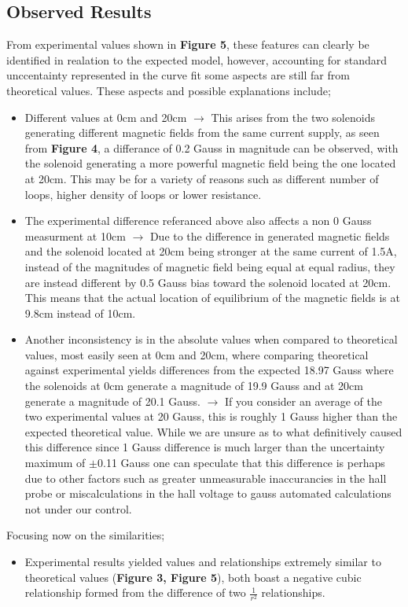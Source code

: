 \documentclass{article}
\begin{document}
   \subsection{Observed Results}
   From experimental values shown in \textbf{Figure 5}, these features can clearly be identified in realation to the expected model, however, accounting
   for standard unccentainty represented in the curve fit some aspects are still far from theoretical values. These aspects and possible explanations include;
   \begin{itemize}
       \item Different values at 0cm and 20cm \(\rightarrow\) This arises from the two solenoids generating different magnetic fields from the same current supply,
       as seen from \textbf{Figure 4}, a differance of 0.2 Gauss in magnitude can be observed, with the solenoid generating a more powerful magnetic field
       being the one located at 20cm. This may be for a variety of reasons such as different number of loops, higher density of loops or lower resistance.
       \item The experimental difference referanced above also affects a non 0 Gauss measurment at 10cm \(\rightarrow\) Due to the difference in generated magnetic fields
       and the solenoid located at 20cm being stronger at the same current of 1.5A, instead of the magnitudes of magnetic field being equal at equal radius, they are instead 
       different by 0.5 Gauss bias toward the solenoid located at 20cm. This means that the actual location of equilibrium of the magnetic fields is at 9.8cm instead of 10cm.
       \item Another inconsistency is in the absolute values when compared to theoretical values, most easily seen at 0cm and 20cm, where comparing theoretical against experimental yields 
       differences from the expected 18.97 Gauss where the solenoids at 0cm generate a magnitude of 19.9 Gauss and at 20cm generate a magnitude of 20.1 Gauss. \(\rightarrow\) If you consider 
       an average of the two experimental values at 20 Gauss, this is roughly 1 Gauss higher than the expected theoretical value. While we are unsure as to what definitively caused this difference 
       since 1 Gauss difference is much larger than the uncertainty maximum of \(\pm\)0.11 Gauss one can speculate that this difference is perhaps due to other factors such as greater unmeasurable inaccurancies
       in the hall probe or miscalculations in the hall voltage to gauss automated calculations not under our control.
   \end{itemize}
   Focusing now on the similarities;
   \begin{itemize}
       \item Experimental results yielded values and relationships extremely similar to theoretical values (\textbf{Figure 3, Figure 5}), both boast a negative cubic relationship 
       formed from the difference of two \(\frac{1}{r^2}\) relationships.
   \end{itemize}
\end{document}
